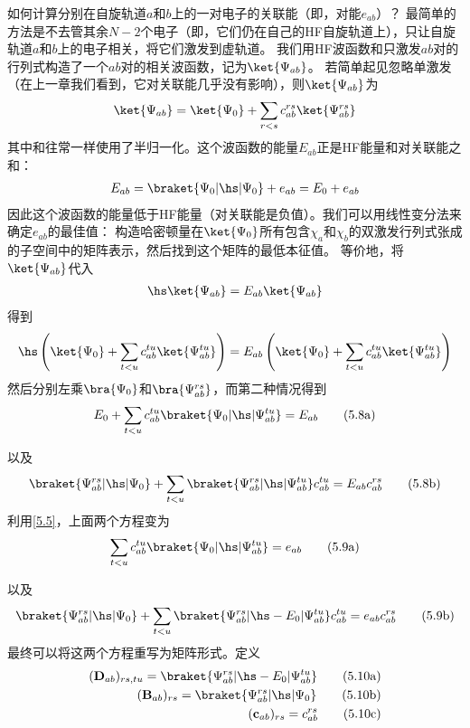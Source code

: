 如何计算分别在自旋轨道$a$和$b$上的一对电子的关联能（即，对能$e_{ab}$）？
最简单的方法是不去管其余$N-2$个电子（即，它们仍在自己的HF自旋轨道上），只让自旋轨道$a$和$b$上的电子相关，将它们激发到虚轨道。
我们用HF波函数和只激发$ab$对的行列式构造了一个$ab$对的相关波函数，记为$\ket{\Psi_{ab}}$。
若简单起见忽略单激发（在上一章我们看到，它对关联能几乎没有影响），则$\ket{\Psi_{ab}}$为
\begin{align}
    \ket{\Psi_{ab}}=\ket{\Psi_0}+\sum_{r<s}c^{rs}_{ab}\ket{\Psi_{ab}^{rs}}
\end{align}
其中和往常一样使用了半归一化。这个波函数的能量$E_{ab}$正是HF能量和对关联能之和：
\begin{align}
    \label{5.5}
    E_{ab}=\braket{\Psi_0|\hs|\Psi_0}+e_{ab}=E_0+e_{ab}
\end{align}
因此这个波函数的能量低于HF能量（对关联能是负值）。我们可以用线性变分法来确定$e_{ab}$的最佳值：
构造哈密顿量在$\ket{\Psi_0}$所有包含$\chi_a$和$\chi_b$的双激发行列式张成的子空间中的矩阵表示，然后找到这个矩阵的最低本征值。
等价地，将$\ket{\Psi_{ab}}$代入
\begin{align}
    \hs\ket{\Psi_{ab}}=E_{ab}\ket{\Psi_{ab}}
\end{align}
得到
\begin{align}
    \hs\left(\ket{\Psi_0}+\sum_{t<u}c^{tu}_{ab}\ket{\Psi_{ab}^{tu}}\right)=E_{ab}\left(\ket{\Psi_0}+\sum_{t<u}c^{tu}_{ab}\ket{\Psi_{ab}^{tu}}\right)
\end{align}
然后分别左乘$\bra{\Psi_0}$和$\bra{\Psi^{rs}_{ab}}$，而第二种情况得到
\begin{align}
    E_0+\sum_{t<u}c^{tu}_{ab}\braket{\Psi_0|\hs|\Psi_{ab}^{tu}}=E_{ab}\tag{5.8a}
\end{align}
\addtocounter{equation}{1}
以及
\begin{align}
    \braket{\Psi_{ab}^{rs}|\hs|\Psi_0}+\sum_{t<u}\braket{\Psi_{ab}^{rs}|\hs|\Psi_{ab}^{tu}}c^{tu}_{ab}=E_{ab}c^{rs}_{ab}\tag{5.8b}
\end{align}
利用\autoref{5.5}，上面两个方程变为
\begin{align}
    \label{5.9a}
    \sum_{t<u}c^{tu}_{ab}\braket{\Psi_0|\hs|\Psi_{ab}^{tu}}=e_{ab}\tag{5.9a}
\end{align}
\addtocounter{equation}{1}
以及
\begin{align}
    \label{5.9b}
    \braket{\Psi_{ab}^{rs}|\hs|\Psi_0}+\sum_{t<u}\braket{\Psi_{ab}^{rs}|\hs-E_0|\Psi_{ab}^{tu}}c^{tu}_{ab}=e_{ab}c^{rs}_{ab}\tag{5.9b}
\end{align}
最终可以将这两个方程重写为矩阵形式。定义
\begin{subequations}
    \begin{align}
        (\mathbf{D}_{ab})_{rs,tu}=\braket{\Psi_{ab}^{rs}|\hs-E_0|\Psi_{ab}^{tu}}\tag{5.10a}\\
        (\mathbf{B}_{ab})_{rs}=\braket{\Psi_{ab}^{rs}|\hs|\Psi_0}\tag{5.10b}\\
        (\mathbf{c}_{ab})_{rs}=c_{ab}^{rs}\tag{5.10c}
    \end{align}
\end{subequations}

